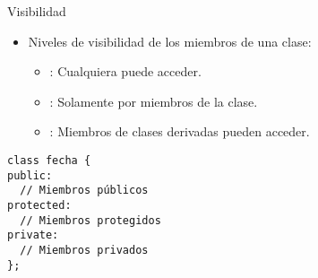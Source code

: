 \begin{frame}[t,fragile]{Visibilidad}
\begin{itemize}
  \item Niveles de visibilidad de los miembros de una clase:
    \begin{itemize}
      \item {}: Cualquiera puede acceder.
      \item {}: Solamente por miembros de la clase.
      \item {}: Miembros de clases derivadas pueden acceder.
    \end{itemize}
\end{itemize}
\vfill
\begin{lstlisting}
class fecha {
public:
  // Miembros públicos
protected:
  // Miembros protegidos
private:
  // Miembros privados
};
\end{lstlisting}
\end{frame}
